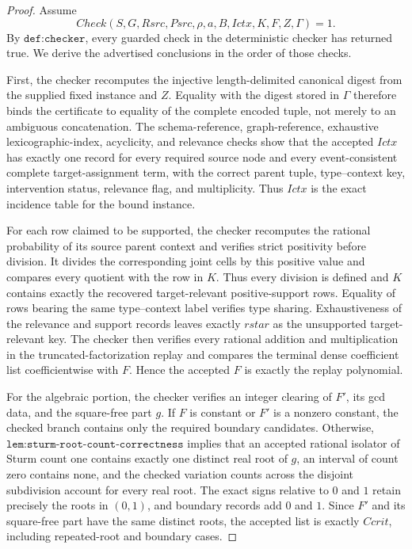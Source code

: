 \documentclass{article}
\begin{document}
\begin{proof}
Assume
\[
 Check(S,G,Rsrc,Psrc,\rho,a,B,Ictx,K,F,Z,\Gamma)=1.
\]
By \(\texttt{def:checker}\), every guarded check in the deterministic checker has returned true.  We derive the advertised conclusions in the order of those checks.

First, the checker recomputes the injective length-delimited canonical digest from the supplied fixed instance and \(Z\).  Equality with the digest stored in \(\Gamma\) therefore binds the certificate to equality of the complete encoded tuple, not merely to an ambiguous concatenation.  The schema-reference, graph-reference, exhaustive lexicographic-index, acyclicity, and relevance checks show that the accepted \(Ictx\) has exactly one record for every required source node and every event-consistent complete target-assignment term, with the correct parent tuple, type--context key, intervention status, relevance flag, and multiplicity.  Thus \(Ictx\) is the exact incidence table for the bound instance.

For each row claimed to be supported, the checker recomputes the rational probability of its source parent context and verifies strict positivity before division.  It divides the corresponding joint cells by this positive value and compares every quotient with the row in \(K\).  Thus every division is defined and \(K\) contains exactly the recovered target-relevant positive-support rows.  Equality of rows bearing the same type--context label verifies type sharing.  Exhaustiveness of the relevance and support records leaves exactly \(rstar\) as the unsupported target-relevant key.  The checker then verifies every rational addition and multiplication in the truncated-factorization replay and compares the terminal dense coefficient list coefficientwise with \(F\).  Hence the accepted \(F\) is exactly the replay polynomial.

For the algebraic portion, the checker verifies an integer clearing of \(F'\), its gcd data, and the square-free part \(g\).  If \(F\) is constant or \(F'\) is a nonzero constant, the checked branch contains only the required boundary candidates.  Otherwise, \(\texttt{lem:sturm-root-count-correctness}\) implies that an accepted rational isolator of Sturm count one contains exactly one distinct real root of \(g\), an interval of count zero contains none, and the checked variation counts across the disjoint subdivision account for every real root.  The exact signs relative to \(0\) and \(1\) retain precisely the roots in \((0,1)\), and boundary records add \(0\) and \(1\).  Since \(F'\) and its square-free part have the same distinct roots, the accepted list is exactly \(Ccrit\), including repeated-root and boundary cases.


\end{proof}
\end{document}
